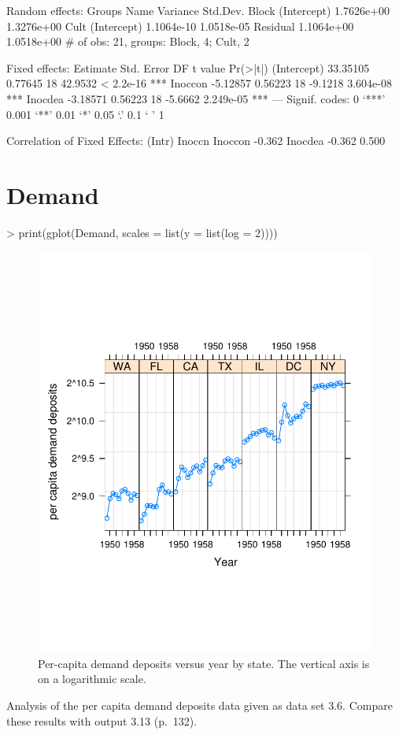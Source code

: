\documentclass[12pt]{article}
\begin{document}
\begin{Schunk}
\begin{Soutput}
Random effects:
 Groups   Name        Variance   Std.Dev.  
 Block    (Intercept) 1.7626e+00 1.3276e+00
 Cult     (Intercept) 1.1064e-10 1.0518e-05
 Residual             1.1064e+00 1.0518e+00
# of obs: 21, groups: Block, 4; Cult, 2

Fixed effects:
            Estimate Std. Error DF t value  Pr(>|t|)    
(Intercept) 33.35105    0.77645 18 42.9532 < 2.2e-16 ***
Inoccon     -5.12857    0.56223 18 -9.1218 3.604e-08 ***
Inocdea     -3.18571    0.56223 18 -5.6662 2.249e-05 ***
---
Signif. codes:  0 `***' 0.001 `**' 0.01 `*' 0.05 `.' 0.1 ` ' 1 

Correlation of Fixed Effects:
        (Intr) Inoccn
Inoccon -0.362       
Inocdea -0.362  0.500
\end{Soutput}
\end{Schunk}

\section{Demand}
\label{sec:Demand}

\begin{Schunk}
\begin{Sinput}
> print(gplot(Demand, scales = list(y = list(log = 2))))
\end{Sinput}
\end{Schunk}
\begin{figure}[tbp]
  \centering
  \includegraphics{figs/f-demand1}
  \caption{Per-capita demand deposits versus year by state.  The
    vertical axis is on a logarithmic scale.}
  \label{fig:demand1}
\end{figure}
Analysis of the per capita demand deposits data given as data set 3.6.
Compare these results with output 3.13 (p.~132).
\end{document}
